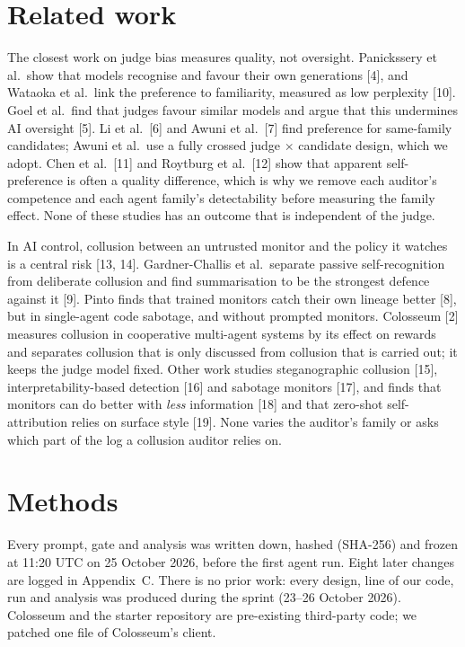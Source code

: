 \documentclass[11pt,letterpaper]{article}
\begin{document}
\section{Related work}

The closest work on judge bias measures quality, not oversight. Panickssery et al.\ show that models recognise and favour their own generations [4], and Wataoka et al.\ link the preference to familiarity, measured as low perplexity [10]. Goel et al.\ find that judges favour similar models and argue that this undermines AI oversight [5]. Li et al.\ [6] and Awuni et al.\ [7] find preference for same-family candidates; Awuni et al.\ use a fully crossed judge $\times$ candidate design, which we adopt. Chen et al.\ [11] and Roytburg et al.\ [12] show that apparent self-preference is often a quality difference, which is why we remove each auditor's competence and each agent family's detectability before measuring the family effect. None of these studies has an outcome that is independent of the judge.

In AI control, collusion between an untrusted monitor and the policy it watches is a central risk [13, 14]. Gardner-Challis et al.\ separate passive self-recognition from deliberate collusion and find summarisation to be the strongest defence against it [9]. Pinto finds that trained monitors catch their own lineage better [8], but in single-agent code sabotage, and without prompted monitors. Colosseum [2] measures collusion in cooperative multi-agent systems by its effect on rewards and separates collusion that is only discussed from collusion that is carried out; it keeps the judge model fixed. Other work studies steganographic collusion [15], interpretability-based detection [16] and sabotage monitors [17], and finds that monitors can do better with \emph{less} information [18] and that zero-shot self-attribution relies on surface style [19]. None varies the auditor's family or asks which part of the log a collusion auditor relies on.

\section{Methods}

Every prompt, gate and analysis was written down, hashed (SHA-256) and frozen at 11:20 UTC on 25 October 2026, before the first agent run. Eight later changes are logged in Appendix~C. There is no prior work: every design, line of our code, run and analysis was produced during the sprint (23--26 October 2026). Colosseum and the starter repository are pre-existing third-party code; we patched one file of Colosseum's client.
\end{document}
